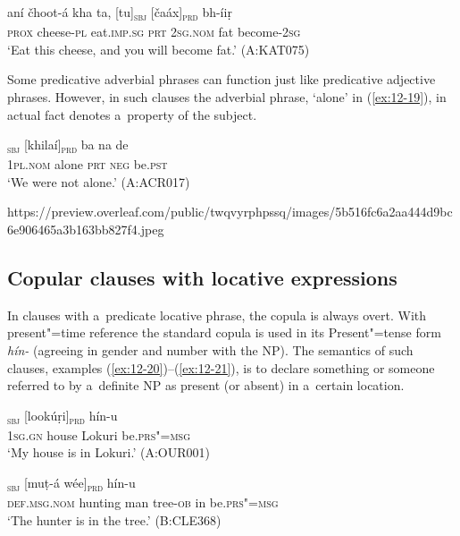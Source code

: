 \begin{exe}
\ex
\label{ex:12-18}
\gll aní čhoot-á kha ta, [tu]\textsubscript{\textsc{sbj}} [čaáx]\textsubscript{\textsc{prd}} bh-íiṛ \\
\textsc{prox} cheese-\textsc{pl} eat.\textsc{imp.sg} \textsc{prt} \textsc{2sg.nom} fat become-\textsc{2sg} \\
\glt `Eat this cheese, and you will become fat.' (A:KAT075)
\end{exe}

Some predicative adverbial phrases can function just like predicative adjective phrases. However, in such clauses the adverbial phrase, `alone' in (\ref{ex:12-19}), in actual fact denotes a~property of the subject.

\begin{exe}
\ex
\label{ex:12-19}
\gll [be]\textsubscript{\textsc{sbj}} [khilaí]\textsubscript{\textsc{prd}} ba na de \\
\textsc{1pl.nom} alone \textsc{prt} \textsc{neg} be.\textsc{pst} \\
\glt `We were not alone.' (A:ACR017)
\end{exe}
https://preview.overleaf.com/public/twqvyrphpssq/images/5b516fc6a2aa444d9bc6e906465a3b163bb827f4.jpeg
\subsection{Copular clauses with locative expressions}
\label{subsec:12-1-3}

In clauses with a~predicate locative phrase, the copula is always overt. With present"=time reference the standard copula is used in its Present"=tense form \textit{hín-} (agreeing in gender and number with the NP). The semantics of such clauses, examples (\ref{ex:12-20})--(\ref{ex:12-21}), is to declare something or someone referred to by a~definite NP as present (or absent) in a~certain location.

\begin{exe}
\ex
\label{ex:12-20}
\textsubscript{\textsc{sbj}} [lookúṛi]\textsubscript{\textsc{prd}} hín-u \\
\textsc{1sg.gn} house Lokuri be.\textsc{prs"=msg} \\
\glt `My house is in Lokuri.' (A:OUR001)
\end{exe}
\begin{exe}
\ex
\label{ex:12-21}
\textsubscript{\textsc{sbj}} [muṭ-á wée]\textsubscript{\textsc{prd}} hín-u \\
\textsc{def.msg.nom} hunting man tree-\textsc{ob} in be.\textsc{prs"=msg} \\
\glt `The hunter is in the tree.' (B:CLE368)
\end{exe}

